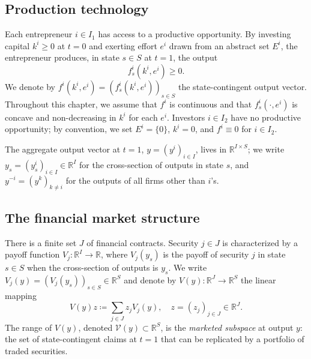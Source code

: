 \documentclass[11pt,a4paper,oneside]{book}
\def\R{\mathbb{R}}
\def\geq{\geqslant}
\theoremstyle{plain}
\theoremstyle{definition}
\theoremstyle{remark}
\numberwithin{equation}{chapter}
\begin{document}
\subsection{Production technology}

Each entrepreneur $i \in I_1$ has access to a productive opportunity.
By investing capital $k^i \geq 0$ at $t=0$ and exerting effort $e^i$ drawn from an abstract set $E^i$, the entrepreneur produces, in state $s \in S$ at $t=1$, the output
\begin{equation*}
  f^i_s(k^i, e^i) \geq 0.
\end{equation*}
We denote by $f^i(k^i, e^i) = (f^i_s(k^i, e^i))_{s \in S}$ the state-contingent output vector.
Throughout this chapter, we assume that $f^i$ is continuous and that $f^i_s(\cdot, e^i)$ is concave and non-decreasing in $k^i$ for each $e^i$.
Investors $i \in I_2$ have no productive opportunity; by convention, we set $E^i = \{0\}$, $k^i = 0$, and $f^i \equiv 0$ for $i \in I_2$.

The aggregate output vector at $t=1$, $y = (y^i)_{i \in I}$, lives in $\R^{I \times S}$; we write $y_s = (y^i_s)_{i \in I} \in \R^I$ for the cross-section of outputs in state $s$, and $y^{-i} = (y^k)_{k \neq i}$ for the outputs of all firms other than $i$'s.

\subsection{The financial market structure}

There is a finite set $J$ of financial contracts.
Security $j \in J$ is characterized by a payoff function $V_j : \R^I \to \R$, where $V_j(y_s)$ is the payoff of security $j$ in state $s \in S$ when the cross-section of outputs is $y_s$.
We write $V_j(y) = (V_j(y_s))_{s \in S} \in \R^S$ and denote by $V(y) : \R^J \to \R^S$ the linear mapping
\begin{equation*}
  V(y) z \coloneqq \sum_{j \in J} z_j V_j(y),
  \quad z = (z_j)_{j \in J} \in \R^J.
\end{equation*}
The range of $V(y)$, denoted $\mathcal{V}(y) \subset \R^S$, is the \emph{marketed subspace} at output $y$: the set of state-contingent claims at $t=1$ that can be replicated by a portfolio of traded securities.
\end{document}
